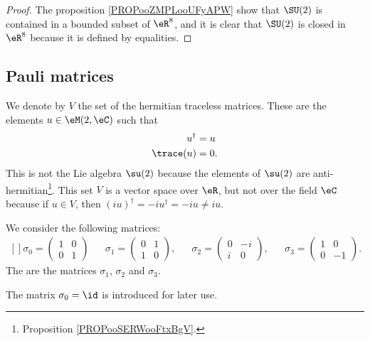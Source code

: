 \begin{proof}
    The proposition \ref{PROPooZMPLooUFyAPW} show that $\SU(2)$ is contained in a bounded subset of $\eR^8$, and it is clear that $\SU(2)$ is closed in $\eR^8$ because it is defined by equalities.
\end{proof}

\subsection{Pauli matrices}

We denote by \( V\) the set of the hermitian traceless matrices. These are the elements \( u\in \eM(2,\eC)\) such that
\begin{subequations}
    \begin{align}
        u^{\dag}&=u\\
        \trace(u)&=0.
    \end{align}
\end{subequations}
This is not the Lie algebra \( \su(2)\) because the elements of \( \su(2)\) are anti-hermitian\footnote{Proposition \ref{PROPooSERWooFtxBgV}.}. This set \( V\) is a vector space over \( \eR\), but not over the field \( \eC\) because if \( u\in V\), then \( (iu)^{\dag}=-iu^{\dag}=-iu\neq iu\).

\begin{definition}      \label{DEFooRNTDooTVkPtB}
    We consider the following matrices:
    \begin{equation}
        \begin{aligned}[]
            \sigma_0=\begin{pmatrix}
                1    &   0    \\ 
                0    &   1    
            \end{pmatrix}&&
            \sigma_1=\begin{pmatrix}
                0    &   1    \\ 
                1    &   0    
            \end{pmatrix},&&
            \sigma_2=\begin{pmatrix}
                0    &   -i    \\ 
                i    &   0    
            \end{pmatrix},&&
            \sigma_3=\begin{pmatrix}
                1    &   0    \\ 
                0    &   -1    
            \end{pmatrix}.
        \end{aligned}
    \end{equation}
    The  are the matrices \( \sigma_1\), \( \sigma_2\) and \( \sigma_3\).
\end{definition}
The matrix \( \sigma_0=\id\) is introduced for later use.

